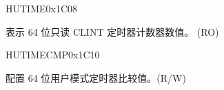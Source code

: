 \begin{register}{H}{UTIME}{0x1C08}\label{regdesc:CLINTUTIMEREG}
%
\regnewline%
%
\regnewline%
\begin{regdesc}
\begin{reglist}
\label{fielddesc:CLINTUTIME}\item [UTIME] 表示 64 位只读 CLINT 定时器计数器数值。 (RO)
\end{reglist}
\end{regdesc}
\end{register}

\begin{register}{H}{UTIMECMP}{0x1C10}\label{regdesc:CLINTUTIMECMPREG}
%
\regnewline%
%
\regnewline%
\begin{regdesc}
\begin{reglist}
\label{fielddesc:CLINTUTIMECMP}\item [UTIMECMP] 配置 64 位用户模式定时器比较值。(R/W)
\end{reglist}
\end{regdesc}
\end{register}
